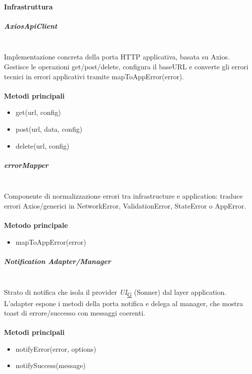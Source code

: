 \documentclass[a4paper,12pt]{article}
\begin{document}
            \paragraph{Infrastruttura}
                \subparagraph{AxiosApiClient}\mbox{}\\
                Implementazione concreta della porta HTTP applicativa, basata su Axios. Gestisce le operazioni {\ttfamily get/post/delete}, configura il {\ttfamily baseURL} e converte gli errori tecnici in errori applicativi tramite {\ttfamily mapToAppError(error)}.\\\\
                \textbf{Metodi principali}
                \begin{itemize}
                    \item {\ttfamily get(url, config)}
                    \item {\ttfamily post(url, data, config)}
                    \item {\ttfamily delete(url, config)}
                \end{itemize}
                
                \subparagraph{errorMapper}\mbox{}\\
                Componente di normalizzazione errori tra infrastructure e application: traduce errori Axios/generici in {\ttfamily NetworkError}, {\ttfamily ValidationError}, {\ttfamily StateError} o {\ttfamily AppError}.\\\\
                \textbf{Metodo principale}
                \begin{itemize}
                    \item {\ttfamily mapToAppError(error)}
                \end{itemize}
                
                \subparagraph{Notification Adapter/Manager}\mbox{}\\
                Strato di notifica che isola il provider \textit{UI}\textsubscript{\href{https://atlasteam9.github.io/Atlas/glossario.html\#UI}{G}} (Sonner) dal layer application. L'adapter espone i metodi della porta notifica e delega al manager, che mostra toast di errore/successo con messaggi coerenti.\\\\
                \textbf{Metodi principali}
                \begin{itemize}
                    \item {\ttfamily notifyError(error, options)}
                    \item {\ttfamily notifySuccess(message)}
                \end{itemize}
\end{document}
